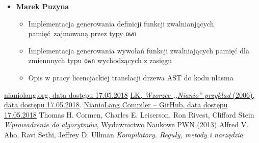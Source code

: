 \documentclass[licencjacka]{pracamgr}
\begin{document}
\begin{itemize}
  \item[] \textbf{Marek Puzyna}
  \begin{itemize}
   \item Implementacja generowania definicji funkcji zwalnianjących pamięć zajmowaną przez typy \texttt{own}
   \item Implementacja generowania wywołań funkcji zwalniających pamięć dla zmiennnych typu \texttt{own} wychodzących
     z zasięgu
   \item Opis w pracy licencjackiej translacji drzewa AST do kodu nlasma
  \end{itemize}
\end{itemize}


\appendix

\begin{thebibliography}{99}

 \href{http://www.nianiolang.org}{nianiolang.org, data dostępu 17.05.2018}
 \href{https://www.mimuw.edu.pl/~chrzaszc/BPJ20067/nianio.pdf}{LK, \textit{Wzorzec ,,Nianio'' przykład} (2006), data dostępu 17.05.2018}.
 \href{https://github.com/nianiolang/nl}{NianioLang Compiler -- GitHub,
data dostępu 17.05.2018}
 Thomas H. Cormen, Charles E. Leiserson, Ron Rivest, Clifford Stein \textit{Wprowadzenie do algorytmów}, Wydawnictwo Naukowe PWN (2013)
 Alfred V. Aho, Ravi Sethi, Jeffrey D. Ullman \textit{Kompilatory. Reguły, metody i narzędzia}


\end{thebibliography}
\end{document}
